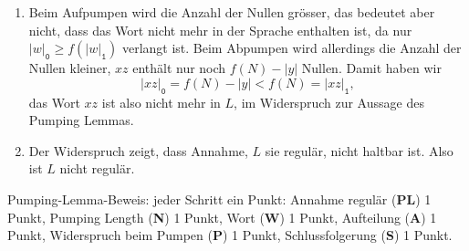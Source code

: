\begin{loesung}
\begin{enumerate}
\begin{center}
\begin{tikzpicture}[>=latex,thick,scale=0.5]
\end{tikzpicture}
\end{center}
\item Beim Aufpumpen wird die Anzahl der Nullen grösser, das bedeutet
aber nicht, dass das Wort nicht mehr in der Sprache enthalten ist,
da nur $|w|_{\texttt{0}} \ge f(|w|_{\texttt{1}})$ verlangt ist.
Beim Abpumpen wird allerdings die Anzahl der Nullen kleiner, $xz$ enthält
nur noch $f(N)-|y|$ Nullen.
Damit haben wir 
\[
|xz|_{\texttt{0}} = f(N)-|y| < f(N) = |xz|_{\texttt{1}},
\]
das Wort $xz$ ist also nicht mehr in $L$, im Widerspruch zur Aussage
des Pumping Lemmas.
\item Der Widerspruch zeigt, dass Annahme, $L$ sie regulär, nicht
haltbar ist.
Also ist $L$ nicht regulär.
\qedhere
\end{enumerate}
\end{loesung}

\begin{bewertung}
Pumping-Lemma-Beweis: jeder Schritt ein Punkt:
Annahme regulär ({\bf PL}) 1 Punkt,
Pumping Length ({\bf N}) 1 Punkt,
Wort ({\bf W}) 1 Punkt,
Aufteilung ({\bf A}) 1 Punkt,
Widerspruch beim Pumpen ({\bf P}) 1 Punkt,
Schlussfolgerung ({\bf S}) 1 Punkt.
\end{bewertung}
